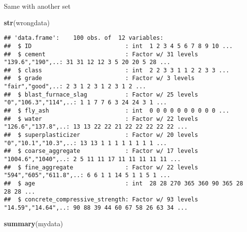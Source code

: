 \documentclass[]{article}
\newenvironment{Shaded}{\begin{snugshade}}{\end{snugshade}}
\newcommand{\KeywordTok}[1]{\textcolor[rgb]{0.13,0.29,0.53}{\textbf{#1}}}
\newcommand{\NormalTok}[1]{#1}
\begin{document}
Same with another set

\begin{Shaded}
\begin{Highlighting}[]
\KeywordTok{str}\NormalTok{(wrongdata)}
\end{Highlighting}
\end{Shaded}

\begin{verbatim}
## 'data.frame':    100 obs. of  12 variables:
##  $ ID                           : int  1 2 3 4 5 6 7 8 9 10 ...
##  $ cement                       : Factor w/ 31 levels "139.6","190",..: 31 31 12 12 3 5 20 20 5 28 ...
##  $ class                        : int  2 2 3 3 1 1 2 2 3 3 ...
##  $ grade                        : Factor w/ 3 levels "fair","good",..: 2 3 1 2 3 1 2 3 1 2 ...
##  $ blast_furnace_slag           : Factor w/ 25 levels "0","106.3","114",..: 1 1 7 7 6 3 24 24 3 1 ...
##  $ fly_ash                      : int  0 0 0 0 0 0 0 0 0 0 ...
##  $ water                        : Factor w/ 22 levels "126.6","137.8",..: 13 13 22 22 21 22 22 22 22 22 ...
##  $ superplasticizer             : Factor w/ 20 levels "0","10.1","10.3",..: 13 13 1 1 1 1 1 1 1 1 ...
##  $ coarse_aggregate             : Factor w/ 17 levels "1004.6","1040",..: 2 5 11 11 17 11 11 11 11 11 ...
##  $ fine_aggregate               : Factor w/ 22 levels "594","605","611.8",..: 6 6 1 1 14 5 1 1 5 1 ...
##  $ age                          : int  28 28 270 365 360 90 365 28 28 28 ...
##  $ concrete_compressive_strength: Factor w/ 93 levels "14.59","14.64",..: 90 88 39 44 60 67 58 26 63 34 ...
\end{verbatim}

\begin{Shaded}
\begin{Highlighting}[]
\KeywordTok{summary}\NormalTok{(mydata)}
\end{Highlighting}
\end{Shaded}
\end{document}
